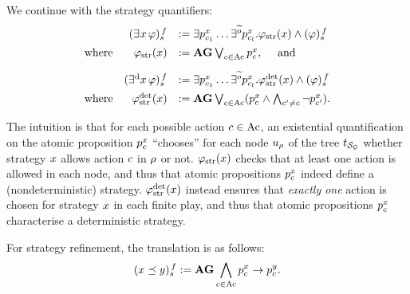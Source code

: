 We continue with the strategy quantifiers:
\[
  \begin{array}{lrl}
& \tr[f]{\Estratnd\phi}	& \egdef  \exists
                                  p_{\mov_{1}}^{\var}\ldots
                                  \exists^{\trobs{\obs}}
                                  p_{\mov_{\maxmov}}^{\var}. \phistrat
                                  \et \tr[f]{\phi}\\[5pt]
  \mbox{where} &  \phistrat & \egdef \A\always
                              \bigou_{\mov\in\Mov}p_{\mov}^{\var},
                              \quad\mbox{ and}\\[10pt]
& \tr[f]{\Estratd\phi}	& \egdef  \exists
                                  p_{\mov_{1}}^{\var}\ldots
                                  \exists^{\trobs{\obs}}
                                  p_{\mov_{\maxmov}}^{\var}. \phistratdet
                                  \et \tr[f]{\phi}\\[5pt]
  \mbox{where} & \phistratdet & \egdef
\A\always\bigou_{\mov\in\Mov}(p_{\mov}^{\var}\et\biget_{\mov'\neq\mov}\neg
p_{\mov'}^{\var}).                              
\end{array}
\]

The intuition is that for each possible action $\mov\in\Mov$, an
existential quantification on the atomic proposition $p_{\mov}^{\var}$
``chooses'' for each  node $\noeud_{\fplay}$ of the tree 
$\unfold[\KS_{\CGS}]{\sstate_{{\pos_0}}}$ whether strategy $\var$
allows action $\mov$ in $\fplay$ or not. 
$\phistrat$  checks that at least one action is allowed in each
node, and thus that atomic propositions
$p_{\mov}^{\var}$ indeed define a (nondeterministic) strategy.
$\phistratdet$ instead ensures that \emph{exactly one} action is chosen for strategy $\var$  in each finite
play, and thus that atomic propositions
$p_{\mov}^{\var}$  characterise a
deterministic strategy.

For strategy refinement, the translation is as follows:
\[\tr[f]{\var \refines \varb} \egdef \A\always\biget_{\mov\in\Mov} p_\mov^\var
  \impl p_\mov^{\varb}.\]

